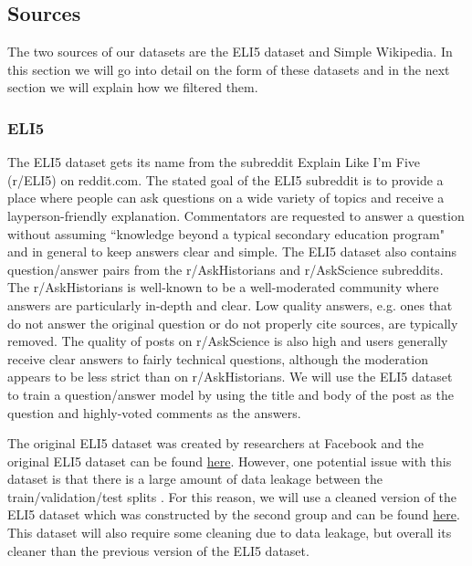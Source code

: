 \documentclass[11pt, oneside]{article}   	%
\begin{document}
\subsection{Sources}
The two sources of our datasets are the ELI5 dataset and Simple Wikipedia.
In this section we will go into detail on the form of these datasets and in the next section we will explain how we filtered them. 

\subsubsection*{ELI5}

The ELI5 dataset gets its name from the subreddit Explain Like I'm Five (r/ELI5) on reddit.com.
The stated goal of the ELI5 subreddit is to provide a place where people can ask questions on a wide variety of topics and receive a layperson-friendly explanation.
Commentators are requested to answer a question without assuming ``knowledge beyond a typical secondary education program" and in general to keep answers clear and simple.
The ELI5 dataset also contains question/answer pairs from the r/AskHistorians and r/AskScience subreddits. The r/AskHistorians is well-known to be a well-moderated community where answers are particularly in-depth and clear. 
Low quality answers, e.g. ones that do not answer the original question or do not properly cite sources, are typically removed.
The quality of posts on r/AskScience is also high and users generally receive clear answers to fairly technical questions, although the moderation appears to be less strict than on r/AskHistorians.
We will use the ELI5 dataset to train a question/answer model by using the title and body of the post as the question and highly-voted comments as the answers.

The original ELI5 dataset was created by researchers at Facebook \cite{fan-etal-2019-eli5} and the original ELI5 dataset can be found \href{https://huggingface.co/datasets/eli5}{here}.
However, one potential issue with this dataset is that there is a large amount of data leakage between the train/validation/test splits \cite{krishna2021hurdles,mahapatra2021new}.
For this reason, we will use a cleaned version of the ELI5 dataset which was constructed by the second group and can be found \href{https://huggingface.co/datasets/vblagoje/lfqa}{here}.
This dataset will also require some cleaning due to data leakage, but overall its cleaner than the previous version of the ELI5 dataset.
\end{document}

